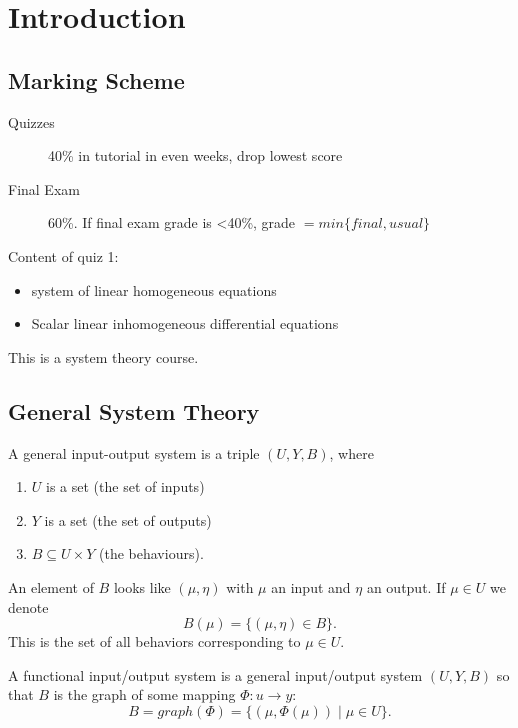 	
	\section{Introduction}
	\subsection{Marking Scheme}
	\begin{description}
		\item[Quizzes] 40\% in tutorial in even weeks, drop lowest score
		\item[Final Exam] 60\%. If final exam grade is <40\%, grade $=min\{final, usual\}$
	\end{description}
	
	Content of quiz 1:

	\begin{itemize}
		\item system of linear homogeneous equations 
		\item Scalar linear inhomogeneous differential equations 
	\end{itemize}
	
	This is a system theory course. 

	\subsection{General System Theory}
	
	\begin{definition}
		A general input-output system is a triple $(U, Y, B)$, where

	\begin{enumerate}
		\item $U$ is a set (the set of inputs)
		\item $Y$ is a set (the set of outputs)
		\item $B \subseteq U \times  Y$ (the behaviours).
	\end{enumerate}
	\end{definition} 
	An element of $B$ looks like $(\mu , \eta)$ with $\mu$ an input and $\eta$ an output. If $\mu \in U$ we denote 
	\[
		B(\mu) = \{(\mu, \eta) \in B\}
	.\]
	This is the set of all behaviors corresponding to $\mu \in U$. 

	\begin{definition}
		A functional input/output system is a general input/output system $(U, Y, B)$ so that $B$ is the graph of some mapping $ \Phi : u \to y $:
	\[
		B = graph(\Phi) = \{(\mu, \Phi (\mu))  \mid \mu \in  U\}
	.\] 
	\end{definition}

